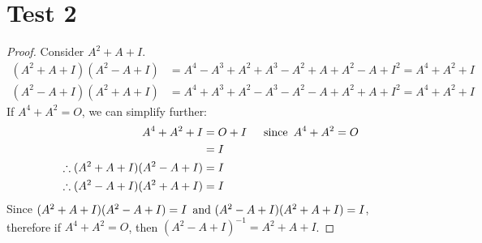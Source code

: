 \documentclass{article}
\newcommand{\assignment}{Test 2}
\begin{document}
\section*{\assignment}

\begin{proof}
    Consider $A^2 + A + I$.
    \begin{align*}
        (A^2 + A + I)(A^2 - A + I) & = A^4 - A^3 + A^2 + A^3 - A^2 + A + A^2 - A + I^2 = A^4 + A^2 + I \\
        (A^2 - A + I)(A^2 + A + I) & = A^4 + A^3 + A^2 - A^3 - A^2 - A + A^2 + A + I^2 = A^4 + A^2 + I
    \end{align*}
    If $A^4 + A^2 = O$, we can simplify further:
    \begin{align*}
        A^4 + A^2 + I                         & = O + I &  & \operatorname{~\text{since}~} A^4 + A^2 = O \\
                                              & = I                                \\
        \therefore (A^2 + A + I)(A^2 - A + I) & = I                                \\
        \therefore (A^2 - A + I)(A^2 + A + I) & = I
    \end{align*}
    Since $(A^2 + A + I)(A^2 - A + I) = I \operatorname{~\text{and}~} (A^2 - A + I)(A^2 + A + I) = I$, therefore if $A^4 + A^2 = O$, then $(A^2 - A + I)^{-1} = A^2 + A + I$.
\end{proof}
\qdash
\end{document}

